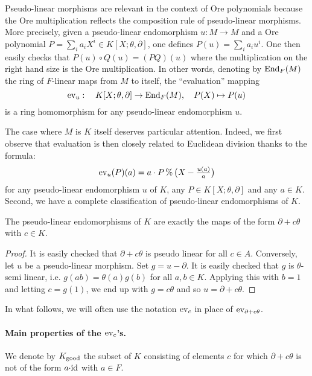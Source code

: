 \documentclass[a4paper]{llncs}
\newcommand{\id}{\textrm{\rm id}}
\newcommand{\End}{\textrm{\rm End}}
\newcommand{\ev}[1]{\textrm{\rm ev}_{#1}}
\renewcommand{\mod}{\,\%\,}
\newcommand{\good}{\textrm{\rm good}}
\begin{document}
Pseudo-linear morphisms are relevant in the context of Ore polynomials 
because the Ore multiplication reflects the composition rule of 
pseudo-linear morphisms. More precisely, given a pseudo-linear 
endomorphism $u : M \to M$ and a Ore polynomial $P = \sum_i a_i X^i \in 
K[X;\theta,\partial]$, one defines $P(u) = \sum_i a_i u^i$. One then 
easily checks that $P(u) \circ Q(u) = (PQ)(u)$ where the multiplication 
on the right hand size is the Ore multiplication. In other words, 
denoting by $\End_F(M)$ the ring of $F$-linear maps from $M$ to itself, 
the ``evaluation'' mapping
$$\ev{u} : \quad K[X;\theta,\partial] \to \End_F(M), \quad
P(X) \mapsto P(u)$$
is a ring homomorphism for any pseudo-linear endomorphism $u$.

The case where $M$ is $K$ itself deserves particular attention.
Indeed, we first observe that evaluation is then closely related to
Euclidean division thanks to the formula:
\begin{equation}
\label{eq:evanddiv}
\textstyle \ev{u}(P)(a) = 
a \cdot P \mod \big(X - \frac{u(a)}{a}\big)
\end{equation}
for any pseudo-linear endomorphism $u$ of $K$, any $P \in K[X;\theta,
\partial]$ and any $a \in K$. Second, we have a complete classification
of pseudo-linear endomorphisms of $K$.

\begin{proposition}
The pseudo-linear endomorphisms of $K$ are exactly the maps of
the form $\partial + c\theta$ with $c \in K$.
\end{proposition}

\begin{proof}
It is easily checked that $\partial + c\theta$ is pseudo linear
for all $c\in A$. Conversely, let $u$ be a pseudo-linear morphism.
Set $g = u - \partial$. It is easily checked that $g$ is 
$\theta$-semi linear, i.e. $g(ab) = \theta(a) g(b)$ for all $a, b 
\in K$. Applying this with $b = 1$ and letting $c = g(1)$, we end
up with $g = c \theta$ and so $u = \partial + c\theta$.
\end{proof}

In what follows, we will often use the notation $\ev c$ in place of 
$\ev{\partial + c \theta}$.

\paragraph{Main properties of the $\ev c$'s.}

We denote by $K_\good$ the subset of $K$ consisting of elements $c$ for 
which $\partial + c\theta$ is not of the form $a{\cdot}\id$ with $a \in 
F$.
\end{document}
